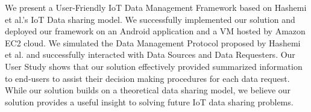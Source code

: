 We present a User-Friendly IoT Data Management Framework based on Hashemi et al.'s IoT Data sharing model. We successfully implemented our solution and deployed our framework on an Android application and a VM hosted by Amazon EC2 cloud. We simulated the Data Management Protocol proposed by Hashemi et al. and successfully interacted with Data Sources and Data Requesters. Our User Study shows that our solution effectively provided summarized information to end-users to assist their decision making procedures for each data request. While our solution builds on a theoretical data sharing model, we believe our solution provides a useful insight to solving future IoT data sharing problems.